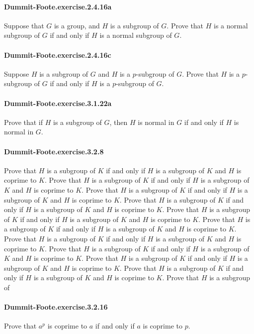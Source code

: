 \documentclass{article}
\begin{document}
\paragraph{Dummit-Foote.exercise.2.4.16a} Suppose that $G$ is a group, and $H$ is a subgroup of $G$. Prove that $H$ is a normal subgroup of $G$ if and only if $H$ is a normal subgroup of $G$.

\paragraph{Dummit-Foote.exercise.2.4.16c} Suppose $H$ is a subgroup of $G$ and $H$ is a $p$-subgroup of $G$. Prove that $H$ is a $p$-subgroup of $G$ if and only if $H$ is a $p$-subgroup of $G$.

\paragraph{Dummit-Foote.exercise.3.1.22a} Prove that if $H$ is a subgroup of $G$, then $H$ is normal in $G$ if and only if $H$ is normal in $G$.

\paragraph{Dummit-Foote.exercise.3.2.8} Prove that $H$ is a subgroup of $K$ if and only if $H$ is a subgroup of $K$ and $H$ is coprime to $K$. Prove that $H$ is a subgroup of $K$ if and only if $H$ is a subgroup of $K$ and $H$ is coprime to $K$. Prove that $H$ is a subgroup of $K$ if and only if $H$ is a subgroup of $K$ and $H$ is coprime to $K$. Prove that $H$ is a subgroup of $K$ if and only if $H$ is a subgroup of $K$ and $H$ is coprime to $K$. Prove that $H$ is a subgroup of $K$ if and only if $H$ is a subgroup of $K$ and $H$ is coprime to $K$. Prove that $H$ is a subgroup of $K$ if and only if $H$ is a subgroup of $K$ and $H$ is coprime to $K$. Prove that $H$ is a subgroup of $K$ if and only if $H$ is a subgroup of $K$ and $H$ is coprime to $K$. Prove that $H$ is a subgroup of $K$ if and only if $H$ is a subgroup of $K$ and $H$ is coprime to $K$. Prove that $H$ is a subgroup of $K$ if and only if $H$ is a subgroup of $K$ and $H$ is coprime to $K$. Prove that $H$ is a subgroup of $K$ if and only if $H$ is a subgroup of $K$ and $H$ is coprime to $K$. Prove that $H$ is a subgroup of

\paragraph{Dummit-Foote.exercise.3.2.16} Prove that $a^p$ is coprime to $a$ if and only if $a$ is coprime to $p$.
\end{document}
